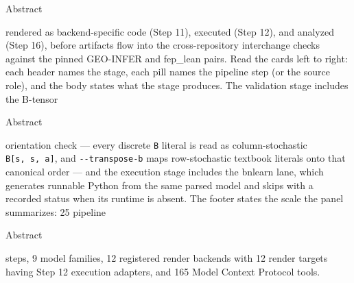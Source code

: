 \documentclass[
  ignorenonframetext,
]{beamer}
\newenvironment{archivecaptionframe}{\par\begingroup}{\par\endgroup}
\begin{document}
\begin{frame}{Abstract}

\begin{archivecaptionframe}

rendered as backend-specific code (Step 11), executed (Step 12), and
analyzed (Step 16), before artifacts flow into the cross-repository
interchange checks against the pinned GEO-INFER and fep\_lean pairs.
Read the cards left to right: each header names the stage, each pill
names the pipeline step (or the source role), and the body states what
the stage produces. The validation stage includes the B-tensor

\end{archivecaptionframe}

\end{frame}

\begin{frame}{Abstract}

\begin{archivecaptionframe}

orientation check --- every discrete \texttt{B} literal is read as
column-stochastic \texttt{B{[}s\textquotesingle{},\ s,\ a{]}}, and
\texttt{-\/-transpose-b} maps row-stochastic textbook literals onto that
canonical order --- and the execution stage includes the bnlearn lane,
which generates runnable Python from the same parsed model and skips
with a recorded status when its runtime is absent. The footer states the
scale the panel summarizes: 25 pipeline

\end{archivecaptionframe}

\end{frame}

\begin{frame}{Abstract}

\begin{archivecaptionframe}

steps, 9 model families, 12 registered render backends with 12 render
targets having Step 12 execution adapters, and 165 Model Context
Protocol tools.

\end{archivecaptionframe}

\end{frame}
\end{document}
